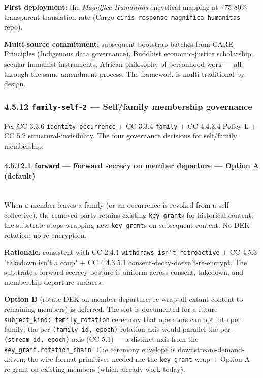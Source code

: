 \documentclass[11pt]{article}
\begin{document}
\textbf{First deployment}: the \textit{Magnifica Humanitas} encyclical mapping at \textasciitilde{}75-80\% transparent translation rate (Cargo \texttt{ciris-response-magnifica-humanitas} repo).


\textbf{Multi-source commitment}: subsequent bootstrap batches from CARE Principles (Indigenous data governance), Buddhist economic-justice scholarship, secular humanist instruments, African philosophy of personhood work — all through the same amendment process. The framework is multi-traditional by design.


\subsubsection*{4.5.12 \texttt{family-self-2} — Self/family membership governance}


Per CC 3.3.6 \texttt{identity\_occurrence} + CC 3.3.4 \texttt{family} + CC 4.4.3.4 Policy L + CC 5.2 structural-invisibility. The four governance decisions for self/family membership.


\paragraph{4.5.12.1 \texttt{forward} — Forward secrecy on member departure — Option A (default)}\mbox{}\\


When a member leaves a family (or an occurrence is revoked from a self-collective), the removed party retains existing \texttt{key\_grant}s for historical content; the substrate stops wrapping new \texttt{key\_grant}s on subsequent content. No DEK rotation; no re-encryption.


\textbf{Rationale}: consistent with CC 2.4.1 \texttt{withdraws-isn't-retroactive} + CC 4.5.3 "takedown isn't a coup" + CC 4.4.3.5.1 consent-decay-doesn't-re-encrypt. The substrate's forward-secrecy posture is uniform across consent, takedown, and membership-departure surfaces.


\textbf{Option B} (rotate-DEK on member departure; re-wrap all extant content to remaining members) is deferred. The slot is documented for a future \texttt{subject\_kind: family\_rotation} ceremony that operators can opt into per family; the per-\texttt{(family\_id, epoch)} rotation axis would parallel the per-\texttt{(stream\_id, epoch)} axis (CC 5.1) — a distinct axis from the \texttt{key\_grant.rotation\_chain}. The ceremony envelope is downstream-demand-driven; the wire-format primitives needed are the \texttt{key\_grant} wrap + Option-A re-grant on existing members (which already work today).
\end{document}
